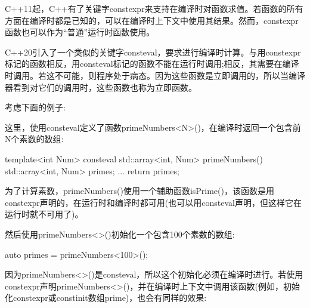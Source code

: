 
C++11起，C++有了关键字constexpr来支持在编译时对函数求值。若函数的所有方面在编译时都是已知的，可以在编译时上下文中使用其结果。然而，constexpr函数也可以作为“普通”运行时函数使用。

C++20引入了一个类似的关键字consteval，要求进行编译时计算。与用constexpr标记的函数相反，用consteval标记的函数不能在运行时调用;相反，其需要在编译时调用。若这不可能，则程序处于病态。因为这些函数是立即调用的，所以当编译器看到对它们的调用时，这些函数也称为立即函数。


考虑下面的例子:



这里，使用consteval定义了函数primeNumbers<N>()，在编译时返回一个包含前N个素数的数组:

\begin{cpp}
template<int Num>
consteval
std::array<int, Num> primeNumbers()
{
	std::array<int, Num> primes;
	...
	return primes;
}
\end{cpp}

为了计算素数，primeNumbers()使用一个辅助函数isPrime()，该函数是用constexpr声明的，在运行时和编译时都可用(也可以用consteval声明，但这样它在运行时就不可用了)。

然后使用primeNumbers<>()初始化一个包含100个素数的数组:

\begin{cpp}
auto primes = primeNumbers<100>();
\end{cpp}

因为primeNumbers<>()是consteval，所以这个初始化必须在编译时进行。若使用constexpr声明primeNumbers<>()，并在编译时上下文中调用该函数(例如，初始化constexpr或constinit数组prime)，也会有同样的效果:

